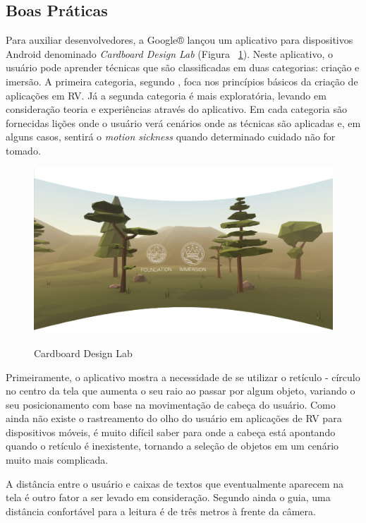 \subsection{Boas Práticas}
\label{ss.boaspraticas}

Para auxiliar desenvolvedores, a Google® lançou um aplicativo para dispositivos Android denominado \textit{Cardboard Design Lab} (Figura ~\ref{f.designlab}). Neste aplicativo, o usuário pode aprender técnicas que são classificadas em duas categorias: criação e imersão. A primeira categoria, segundo , foca nos princípios básicos da criação de aplicações em RV. Já a segunda categoria é mais exploratória, levando em consideração teoria e experiências através do aplicativo. Em cada categoria são fornecidas lições onde o usuário verá cenários onde as técnicas são aplicadas e, em alguns casos, sentirá o \textit{motion sickness} quando determinado cuidado não for tomado. 

\begin{figure}[H]
	\caption{\small Cardboard Design Lab}
	\centering
	\includegraphics[scale=0.5]{Imagens/designlab.png}
	\label{f.designlab}
\end{figure}

Primeiramente, o aplicativo mostra a necessidade de se utilizar o retículo - círculo no centro da tela que aumenta o seu raio ao passar por algum objeto, variando o seu posicionamento com base na movimentação de cabeça do usuário. Como ainda não existe o rastreamento do olho do usuário em aplicações de RV para dispositivos móveis, é muito difícil saber para onde a cabeça está apontando quando o retículo é inexistente, tornando a seleção de objetos em um cenário muito mais complicada. 

A distância entre o usuário e caixas de textos que eventualmente aparecem na tela é outro fator a ser levado em consideração. Segundo ainda o guia, uma distância confortável para a leitura é de três metros à frente da câmera. 

